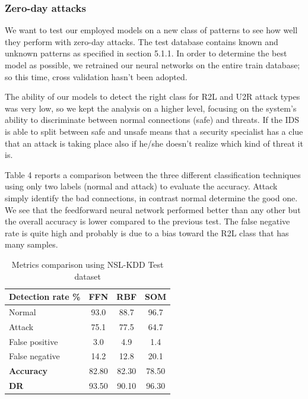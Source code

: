 \documentclass[twocolumn,11pt]{asme2ej}
\begin{document}
\subsubsection{Zero-day attacks}

We want to test our employed models on a new class of patterns to see how well they perform with zero-day attacks. The test database contains known and unknown patterns as specified in section 5.1.1. In order to determine the best model as possible, we retrained our neural networks on the entire train database; so this time, cross validation hasn't been adopted.

The ability of our models to detect the right class for R2L and U2R attack types was very low, so we kept the analysis on a higher level, focusing on the system's ability to discriminate between normal connections (safe) and threats. If the IDS is able to split between safe and unsafe means that a security specialist has a clue that an attack is taking place also if he/she doesn't realize which kind of threat it is.

Table 4 reports a comparison between the three different classification techniques using only two labels (normal and attack) to evaluate the accuracy. Attack simply identify the bad connections, in contrast normal determine the good one. We see that the feedforward neural network performed better than any other but the overall accuracy is lower compared to the previous test. The false negative rate is quite high and probably is due to a bias toward the R2L class that has many samples.

\begin{table}[t]
\caption{Metrics comparison using NSL-KDD Test dataset}
\begin{center}
\label{table_ASME}
\begin{tabular}{l c c c} %
\\\hline
\textbf{Detection rate \%} \hspace{0cm}& \textbf{FFN} \hspace{0cm}& \textbf{RBF} \hspace{0cm}& \textbf{SOM}\\
\hline
Normal & 93.0 & 88.7 & 96.7\\
Attack & 75.1 & 77.5 & 64.7\\
False positive & 3.0 & 4.9 & 1.4\\
False negative & 14.2 & 12.8 & 20.1\\
\hline
\textbf{Accuracy} & 82.80 & 82.30 & 78.50\\
\textbf{DR} & 93.50 & 90.10 & 96.30\\
\hline
\end{tabular}
\end{center}
\end{table}
\end{document}
